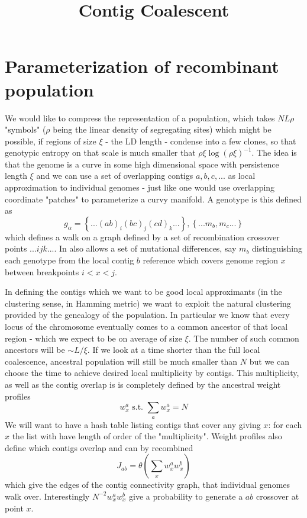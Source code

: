 \documentclass{article}
\begin{document}
\title{Contig Coalescent}
\maketitle


\section{Parameterization of recombinant population}
We would like to compress the representation of a population, which takes $N L\rho$ "symbols" ($\rho$ being the linear density of segregating sites) which might be possible, if regions of size $\xi$ - the LD length - condense into a few clones, so that genotypic entropy on that scale is much smaller that $\rho \xi \log (\rho \xi )^{-1}$. The idea is that the genome is a curve in some high dimensional space with persistence length $\xi$ and we can use a set of overlapping contigs ${a,b,c,...}$ as local approximation to individual genomes - just like one would use overlapping coordinate "patches" to parameterize a curvy manifold. A genotype is this defined as
\begin{equation}
g_{\alpha}=\left \{ ...(ab)_i (bc)_j (cd)_k ... \right \}, \left \{ ...m_b,m_c...\right \}
\end{equation}
which defines a walk on a graph defined by a set of recombination crossover points ${...ijk...}$. In also allows a set of mutational differences, say $m_b$ distinguishing each genotype from the local contig $b$ reference which covers genome region $x$ between breakpoints $i<x<j$.

In defining the contigs which we want to be good local approximants (in the clustering sense, in Hamming metric)  we want to exploit the natural clustering provided by the genealogy of the population. In particular we know that every locus of the chromosome eventually comes to a common ancestor of that local  region - which we expect to be on average of size $\xi$.  The number of such common ancestors will be $\sim L/\xi$. If we look at a time shorter than the full local coalescence, ancestral population will still be much smaller than $N$ but we can choose the time to achieve desired local multiplicity by contigs. This multiplicity, as well as the contig overlap is is completely defined by the ancestral weight profiles
\begin{equation}
w_x^a \text{   s.t.        } \sum_a w_x^a =N
\end{equation}
We will want to have a hash table listing contigs that cover any giving $x$: for each $x$ the list with have length of order of the "multiplicity". Weight profiles also define which contigs overlap and can by recombined
\begin{equation}
J_{ab}=\theta (\sum_x w_x^a  w_x^b)
\end{equation}
which give the edges of the contig connectivity graph, that individual genomes walk over. Interestingly $N^{-2} w_x^aw_x^b$ give a probability to generate a $ab$ crossover at point $x$.
\end{document}
